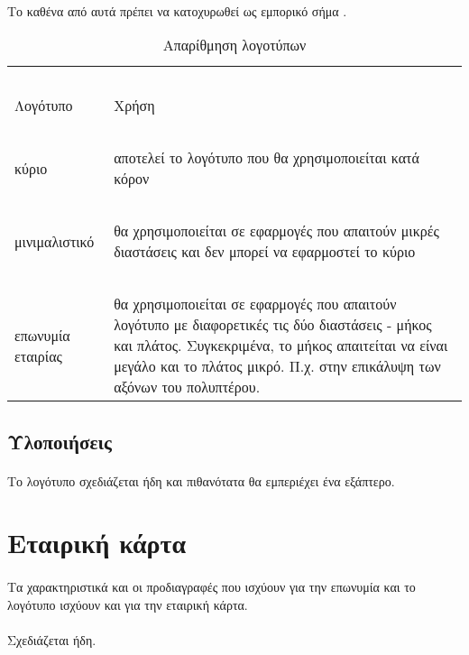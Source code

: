 \documentclass[a4paper, 12pt, twoside]{report}
\begin{document}
			\paragraph{}{Το καθένα από αυτά πρέπει να κατοχυρωθεί ως εμπορικό σήμα \textregistered.
			}
			
			
			\begin{table}[ht]
				\centering
				\begin{tabular}{ m{3cm}  m{9cm} } 
					~\\
					Λογότυπο & Χρήση \\ 
					\hline
					~\\
					κύριο & αποτελεί το λογότυπο που θα χρησιμοποιείται κατά κόρον \\ 
					\hdashline
					~\\
					μινιμαλιστικό & θα χρησιμοποιείται σε εφαρμογές που απαιτούν μικρές διαστάσεις και δεν μπορεί να εφαρμοστεί το κύριο \\ 
					\hdashline
					~\\
					επωνυμία εταιρίας & θα χρησιμοποιείται σε εφαρμογές που απαιτούν λογότυπο με διαφορετικές τις δύο διαστάσεις - μήκος και πλάτος. Συγκεκριμένα, το μήκος απαιτείται να είναι μεγάλο και το πλάτος μικρό. Π.χ. στην επικάλυψη των αξόνων του πολυπτέρου. \\
				\end{tabular}
				\caption{Απαρίθμηση λογοτύπων}
				\label{πιν.:Απαρίθμηση λογοτύπων}
			\end{table}
			
		\subsection{Υλοποιήσεις}
			\paragraph{}{Το λογότυπο σχεδιάζεται ήδη και πιθανότατα θα εμπεριέχει ένα εξάπτερο.
			}
			
		
		\section{Εταιρική κάρτα}{
		}
			\paragraph{}{Τα χαρακτηριστικά και οι προδιαγραφές που ισχύουν για την επωνυμία και το λογότυπο ισχύουν και για την εταιρική κάρτα.
			}
			\paragraph{}{Σχεδιάζεται ήδη.
			}
\end{document}

